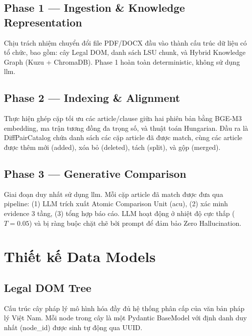 \subsection{Phase 1 — Ingestion \& Knowledge Representation}

Chịu trách nhiệm chuyển đổi file PDF/DOCX đầu vào thành cấu trúc dữ liệu có tổ chức, bao gồm: cây Legal DOM, danh sách LSU chunk, và Hybrid Knowledge Graph (Kuzu + ChromaDB). Phase 1 hoàn toàn deterministic, không sử dụng \gls{llm}.

\subsection{Phase 2 — Indexing \& Alignment}

Thực hiện ghép cặp tối ưu các article/clause giữa hai phiên bản bằng BGE-M3 embedding, ma trận tương đồng đa trọng số, và thuật toán Hungarian. Đầu ra là DiffPairCatalog chứa danh sách các cặp article đã được match, cùng các article được thêm mới (added), xóa bỏ (deleted), tách (split), và gộp (merged).

\subsection{Phase 3 — Generative Comparison}

Giai đoạn duy nhất sử dụng \gls{llm}. Mỗi cặp article đã match được đưa qua pipeline: (1) LLM trích xuất Atomic Comparison Unit (\gls{acu}), (2) xác minh evidence 3 tầng, (3) tổng hợp báo cáo. LLM hoạt động ở nhiệt độ cực thấp ($T=0.05$) và bị ràng buộc chặt chẽ bởi prompt để đảm bảo Zero Hallucination.

\section{Thiết kế Data Models}

\subsection{Legal DOM Tree}

Cấu trúc cây pháp lý mô hình hóa đầy đủ hệ thống phân cấp của văn bản pháp lý Việt Nam. Mỗi node trong cây là một Pydantic BaseModel với định danh duy nhất (node\_id) được sinh tự động qua UUID.

